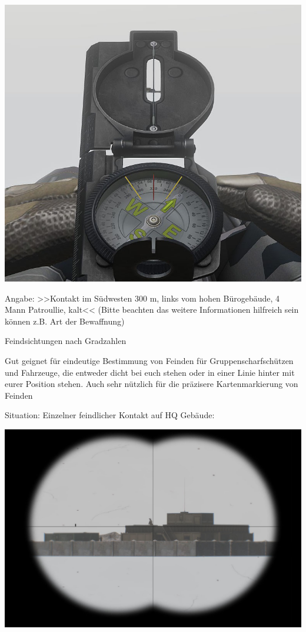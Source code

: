 \begin{minipage}[t]{1\textwidth}
	\includegraphics[width=\textwidth]{./Grafiken/KarteUndMarkierungen/Kompass2.jpg}
\end{minipage}

	Angabe: >>Kontakt im Südwesten 300 m, links vom hohen Bürogebäude, 4 Mann Patroullie, kalt<< (Bitte beachten das weitere Informationen hilfreich sein können z.B. Art der Bewaffnung)

	Feindsichtungen nach Gradzahlen

	Gut geignet für eindeutige Bestimmung von Feinden für Gruppenscharfschützen und Fahrzeuge, die entweder dicht bei euch stehen oder in einer Linie hinter mit eurer Position stehen. Auch sehr nützlich für die präzisere Kartenmarkierung von Feinden

 	Situation: Einzelner feindlicher Kontakt auf HQ Gebäude: \\
\begin{minipage}[t]{1\textwidth}
	\includegraphics[width=\textwidth]{./Grafiken/KarteUndMarkierungen/Kompass3.jpg}
\end{minipage}

